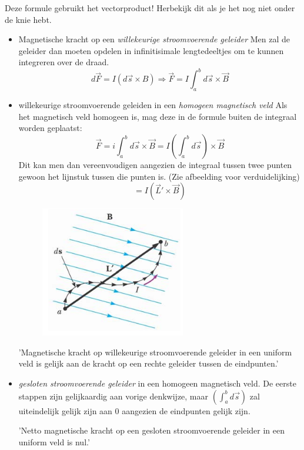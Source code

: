 \documentclass[12pt,a4paper]{article}
\begin{document}
	Deze formule gebruikt het vectorproduct! Herbekijk dit als je het nog niet onder de knie hebt. 
	\begin{itemize}
		\renewcommand\labelitemi{--}
		\item Magnetische kracht op een \textit{willekeurige stroomvoerende geleider}
		\newline
		Men zal de geleider dan moeten opdelen in infinitisimale lengtedeeltjes om te kunnen integreren over de draad. 
		\[d\vec{F} = I(d\vec{s}\times B) \Rightarrow \vec{F} = I \int_{a}^{b}d\vec{s}\times\vec{B}\]
		\item willekeurige stroomvoerende geleiden in een \textit{homogeen magnetisch veld}
		\newline
		Als het magnetisch veld homogeen is, mag deze in de formule buiten de integraal worden geplaatst: 
		\[\vec{F} = i\int_a^b d\vec{s}\times\vec{B} = I (\int_a^b d\vec{s})\times\vec{B}\]
		Dit kan men dan vereenvoudigen aangezien de integraal tussen twee punten gewoon het lijnstuk tussen die punten is. (Zie afbeelding voor verduidelijking)
		\[= I(\vec{L}' \times \vec{B})\]
		\begin{figure}[h]
			\centering
			\includegraphics[width=0.4\linewidth]{images/27.3-willekeurig_pad}
		\end{figure}
		
		'Magnetische kracht op willekeurige stroomvoerende geleider in een uniform veld is gelijk aan de kracht op een rechte geleider tussen de eindpunten.'
		\item \textit{gesloten stroomvoerende geleider} in een homogeen magnetisch veld.
		\newline
		De eerste stappen zijn gelijkaardig aan vorige denkwijze, maar \((\int_a^b d\vec{s})\) zal uiteindelijk gelijk zijn aan 0 aangezien de eindpunten gelijk zijn. 
		
		'Netto magnetische kracht op een gesloten stroomvoerende geleider in een uniform veld is nul.'
	\end{itemize}
	\newpage
\end{document}
